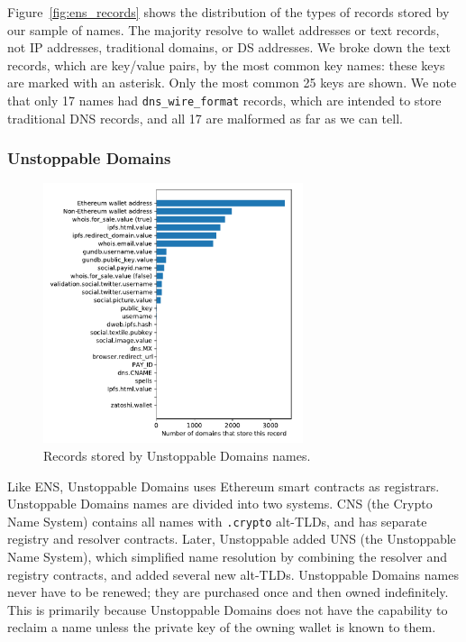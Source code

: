 Figure~\ref{fig:ens_records} shows the distribution of the types of records 
stored by our sample of names. The majority resolve to wallet addresses or text 
records, not IP addresses, traditional domains, or DS addresses. We broke down 
the text records, which are key/value pairs, by the most common key names: 
these keys are marked with an asterisk. Only the most common 25 keys are shown. 
We note that only 17 names had \texttt{dns\_wire\_format} records, which are 
intended to store traditional DNS 
records, and all 17 are malformed as far as we can tell. 

%

\subsubsection{Unstoppable Domains}
\label{sec:unstoppable_overview}

\begin{figure}[t]
	\centering
	\includegraphics[width=3in]{figs/all_unstoppable_records.pdf}
	\caption{Records stored by Unstoppable Domains names.}
	\label{fig:unstoppable_records}
\end{figure}


Like ENS, Unstoppable Domains uses Ethereum smart contracts as 
registrars. Unstoppable Domains names are divided into two systems. CNS 
(the Crypto Name System) contains all names with \texttt{.crypto} 
alt-TLDs, and has separate registry and resolver contracts. Later, Unstoppable 
added UNS 
(the Unstoppable Name System), which simplified name resolution by 
combining the resolver and registry contracts, and added several 
new alt-TLDs. Unstoppable Domains names never have to be renewed; they are 
purchased once and then owned indefinitely. This is primarily 
because Unstoppable Domains does not have the capability to 
reclaim a name unless the private key of the owning wallet is 
known to them.

